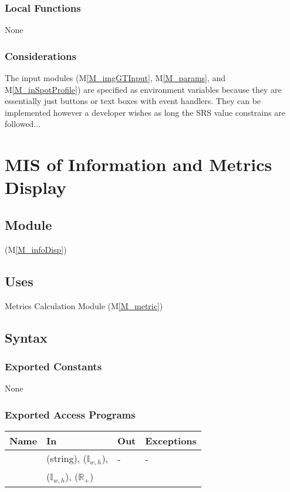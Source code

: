 \documentclass[12pt, titlepage]{article}
\newcommand{\mref}[1]{M\ref{#1}}
\newcommand{\mrefp}[1]{(\mref{#1})}
\newcommand{\mreff}[1]{Module \mrefp{#1}}
\begin{document}
\subsubsection{Local Functions}
None

\subsubsection{Considerations}
The input modules (\mref{M_imgGTInput}, \mref{M_params}, and \mref{M_inSpotProfile})
are specified as environment variables because they are essentially just
buttons or text boxes with event handlers. They can be implemented however a developer wishes
as long the SRS value constrains are followed...

\newpage



\section{MIS of Information and Metrics Display} \label{MS_infoDisp}

\subsection{Module}
 \mrefp{M_infoDisp}

\subsection{Uses}
Metrics Calculation \mreff{M_metric}

\subsection{Syntax}

\subsubsection{Exported Constants}
None

\subsubsection{Exported Access Programs}

\begin{center}
\begin{tabular}{L{3cm} L{5cm} L{3cm} L{3cm}}
\hline
\textbf{Name} & \textbf{In} & \textbf{Out} & \textbf{Exceptions} \\
\hline
{} &  (string),  ($\mathbb{I}_{w,h}$), & - & - \\
                  &  ($\mathbb{I}_{w,h}$),  ($\mathbb{R}_+$) \\
\hline
\end{tabular}
\end{center}
\end{document}
